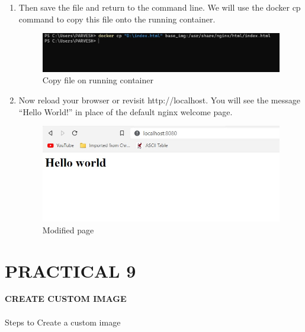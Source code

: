 \documentclass[12pt]{article}
\begin{document}
\begin{enumerate}
\item Then save the file and return to the command line. We will use the docker cp command to copy this file onto the running container.

\begin{figure}[H]
\centering
\includegraphics[scale=0.7]{fig32}
\caption{Copy file on running container}
\vspace{0.6\baselineskip}
\end{figure}	

\item Now reload your browser or revisit http://localhost. You will see the message “Hello World!” in place of the default nginx welcome page.

\begin{figure}[H]
\centering
\includegraphics[scale=0.7]{fig33}
\caption{Modified page}
\vspace{0.6\baselineskip}
\end{figure}	


\end{enumerate}

\clearpage

\section{PRACTICAL 9}

\textbf{\uppercase {Create Custom image}} \\
\vspace{0.1\baselineskip} \\

Steps to Create a custom image 
\end{document}
